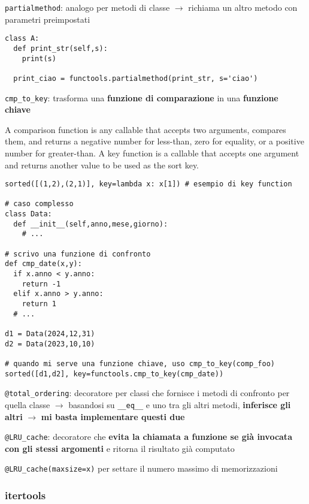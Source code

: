 \texttt{partialmethod}: analogo per metodi di classe $\rightarrow$ richiama un altro metodo con parametri preimpostati

\begin{verbatim}
class A:
  def print_str(self,s):
    print(s)
  
  print_ciao = functools.partialmethod(print_str, s='ciao')
\end{verbatim}

\texttt{cmp_to_key}: trasforma una \textbf{funzione di comparazione} in una \textbf{funzione chiave}

\begin{displayquote}
 A comparison function is any callable that accepts two arguments, compares them, and returns a negative number for less-than, zero for equality, or a positive number for greater-than. A key function is a callable that accepts one argument and returns another value to be used as the sort key.
\end{displayquote}

\begin{verbatim}
sorted([(1,2),(2,1)], key=lambda x: x[1]) # esempio di key function

# caso complesso
class Data:
  def __init__(self,anno,mese,giorno):
    # ...

# scrivo una funzione di confronto
def cmp_date(x,y):
  if x.anno < y.anno:
    return -1
  elif x.anno > y.anno:
    return 1
  # ...
  
d1 = Data(2024,12,31)
d2 = Data(2023,10,10)

# quando mi serve una funzione chiave, uso cmp_to_key(comp_foo)
sorted([d1,d2], key=functools.cmp_to_key(cmp_date))
\end{verbatim}

\texttt{@total_ordering}: decoratore per classi che fornisce i metodi di confronto per quella classe $\rightarrow$ basandosi su \texttt{__eq__} e uno tra gli altri metodi, \textbf{inferisce gli altri} $\rightarrow$ \textbf{mi basta implementare questi due}

\texttt{@LRU_cache}: decoratore che \textbf{evita la chiamata a funzione se gi\`a invocata con gli stessi argomenti} e ritorna il risultato gi\`a computato

\texttt{@LRU_cache(maxsize=x)} per settare il numero massimo di memorizzazioni

\subsubsection{itertools}

